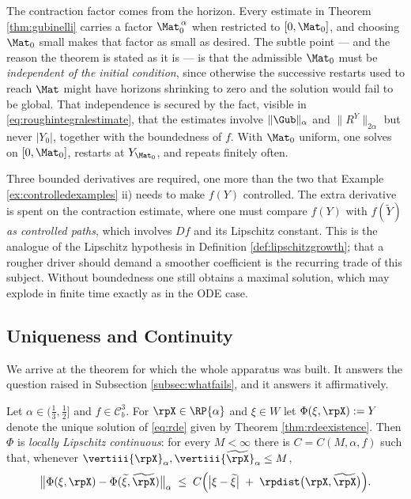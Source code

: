 The contraction factor comes from the horizon. Every estimate in Theorem \ref{thm:gubinelli} carries
a factor $\Mat_0^{\,\alpha}$ when restricted to $[0,\Mat_0]$, and choosing $\Mat_0$ small makes that
factor as small as desired. The subtle point --- and the reason the theorem is stated as it is --- is
that the admissible $\Mat_0$ must be \emph{independent of the initial condition}, since otherwise the
successive restarts used to reach $\Mat$ might have horizons shrinking to zero and the solution would
fail to be global. That independence is secured by the fact, visible in \eqref{eq:roughintegralestimate},
that the estimates involve $\lVert \Gub\rVert_\alpha$ and $\lVert R^Y\rVert_{2\alpha}$ but never
$|Y_0|$, together with the boundedness of $f$. With $\Mat_0$ uniform, one solves on $[0,\Mat_0]$,
restarts at $Y_{\Mat_0}$, and repeats finitely often.

\begin{remark}\label{rem:c3}
Three bounded derivatives are required, one more than the two that Example
\ref{ex:controlledexamples} ii) needs to make $f(Y)$ controlled. The extra derivative is spent on
the contraction estimate, where one must compare $f(Y)$ with $f(\widetilde Y)$ \emph{as controlled
paths}, which involves $Df$ and its Lipschitz constant. This is the analogue of the Lipschitz
hypothesis in Definition \ref{def:lipschitzgrowth}; that a rougher driver should demand a smoother
coefficient is the recurring trade of this subject. Without boundedness one still obtains a maximal
solution, which may explode in finite time exactly as in the ODE case.
\end{remark}

\subsection{Uniqueness and Continuity}\label{subsec:ult}

We arrive at the theorem for which the whole apparatus was built. It answers the question raised in
Subsection \ref{subsec:whatfails}, and it answers it affirmatively.

\begin{theorem}\label{thm:ult}
Let $\alpha \in (\tfrac13,\tfrac12]$ and $f \in \mathcal{C}^3_b$. For $\rpX \in \RP{\alpha}$ and
$\xi \in W$ let $\Phi(\xi,\rpX) := Y$ denote the unique solution of \eqref{eq:rde} given by Theorem
\ref{thm:rdeexistence}. Then $\Phi$ is \emph{locally Lipschitz continuous}: for every $M<\infty$
there is $C = C(M,\alpha,f)$ such that, whenever
$\vertiii{\rpX}_\alpha, \vertiii{\widetilde\rpX}_\alpha \leq M$,
\begin{equation}\label{eq:ult}
\bigl\lVert \Phi(\xi,\rpX) - \Phi(\widetilde\xi,\widetilde\rpX) \bigr\rVert_{\alpha}
\;\leq\; C\Bigl( \bigl|\xi - \widetilde\xi\bigr| \;+\; \rpdist\bigl(\rpX,\widetilde\rpX\bigr) \Bigr).
\end{equation}
\end{theorem}

